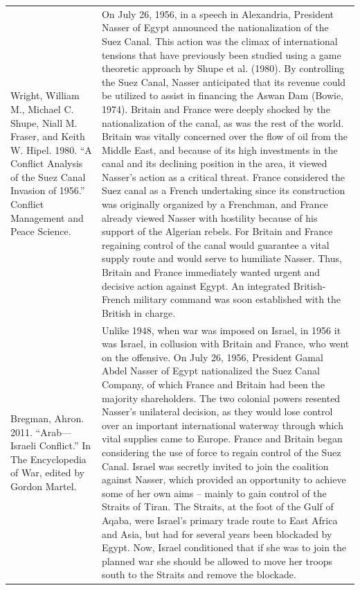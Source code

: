 {\begin{longtable}{p{}p{}}
Wright, William M., Michael C. Shupe, Niall M. Fraser, and Keith W. Hipel. 1980. “A Conflict Analysis of the Suez Canal Invasion of 1956.” Conflict Management and Peace Science. & On July 26, 1956, in a speech in Alexandria, President Nasser of Egypt announced the nationalization of the Suez Canal. This action was the climax of international tensions that have previously been studied using a game theoretic approach by Shupe et al. (1980). By controlling the Suez Canal, Nasser anticipated that its revenue could be utilized to assist in financing the Aswan Dam (Bowie, 1974). Britain and France were deeply shocked by the nationalization of the canal, as was the rest of the world. Britain was vitally concerned over the flow of oil from the Middle East, and because of its high investments in the canal and its declining position in the area, it viewed Nasser's action as a critical threat. France considered the Suez canal as a French undertaking since its construction was originally organized by a Frenchman, and France already viewed Nasser with hostility because of his support of the Algerian rebels. For Britain and France regaining control of the canal would guarantee a vital supply route and would serve to humiliate Nasser. Thus, Britain and France immediately wanted urgent and decisive action against Egypt. An integrated British-French military command was soon established with the British in charge.
\\
Bregman, Ahron. 2011. “Arab—Israeli Conflict.” In The Encyclopedia of War, edited by Gordon Martel. & Unlike 1948, when war was imposed on Israel, in 1956 it was Israel, in collusion with Britain and France, who went on the offensive. On July 26, 1956, President Gamal Abdel Nasser of Egypt nationalized the Suez Canal Company, of which France and Britain had been the majority shareholders. The two colonial powers resented Nasser's unilateral decision, as they would lose control over an important international waterway through which vital supplies came to Europe. France and Britain began considering the use of force to regain control of the Suez Canal. Israel was secretly invited to join the coalition against Nasser, which provided an opportunity to achieve some of her own aims – mainly to gain control of the Straits of Tiran. The Straits, at the foot of the Gulf of Aqaba, were Israel's primary trade route to East Africa and Asia, but had for several years been blockaded by Egypt. Now, Israel conditioned that if she was to join the planned war she should be allowed to move her troops south to the Straits and remove the blockade.

\end{longtable}}
